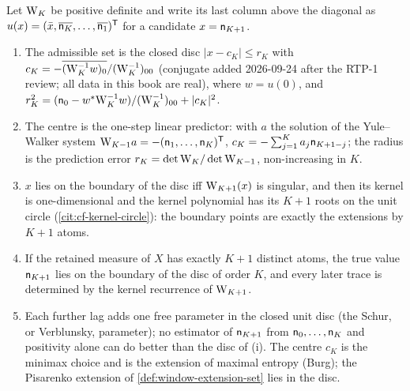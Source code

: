 \begin{proposition}
\label{prop:extension-disc}
Let $\mathrm{W}_K$ be positive definite and write its last column above the diagonal as
$u(x) = (\bar x,\overline{\mathsf n_{K}},\dots,\overline{\mathsf n_{1}})^{\mathsf T}$ for a candidate
$x = \mathsf n_{K+1}$.
\begin{enumerate}
\item[(i)] The admissible set is the closed disc $|x - c_K|\le r_K$ with
  $c_K = -\overline{(\mathrm{W}_K^{-1}w)_0}/(\mathrm{W}_K^{-1})_{00}$ (conjugate added 2026-09-24 after the RTP-1 review; all data in this book are real), where $w = u(0)$, and
  $r_K^2 = (\mathsf n_{0} - w^*\mathrm{W}_K^{-1}w)/(\mathrm{W}_K^{-1})_{00} + |c_K|^2$.
\item[(ii)] The centre is the one-step linear predictor: with $a$ the solution of the
  Yule--Walker system $\mathrm{W}_{K-1}a = -(\mathsf n_{1},\dots,\mathsf n_{K})^{\mathsf T}$,
  $c_K = -\sum_{j=1}^{K}a_j\mathsf n_{K+1-j}$; the radius is the prediction error
  $r_K = \det\mathrm{W}_K/\det\mathrm{W}_{K-1}$, non-increasing in $K$.
\item[(iii)] $x$ lies on the boundary of the disc iff $\mathrm{W}_{K+1}(x)$ is singular, and then its
  kernel is one-dimensional and the kernel polynomial has its $K+1$ roots on the unit circle
  (\cref{cit:cf-kernel-circle}): the boundary points are exactly the extensions by $K+1$ atoms.
\item[(iv)] If the retained measure of $X$ has exactly $K+1$ distinct atoms, the true value
  $\mathsf n_{K+1}$ lies on the boundary of the disc of order $K$, and every later trace is determined
  by the kernel recurrence of $\mathrm{W}_{K+1}$.
\item[(v)] Each further lag adds one free parameter in the closed unit disc (the Schur, or
  Verblunsky, parameter); no estimator of $\mathsf n_{K+1}$ from $\mathsf n_{0},\dots,\mathsf n_{K}$ and
  positivity alone can do better than the disc of (i). The centre $c_K$ is the minimax choice and
  is the extension of maximal entropy (Burg); the Pisarenko extension of
  \cref{def:window-extension-set} lies in the disc.
\end{enumerate}
\end{proposition}

